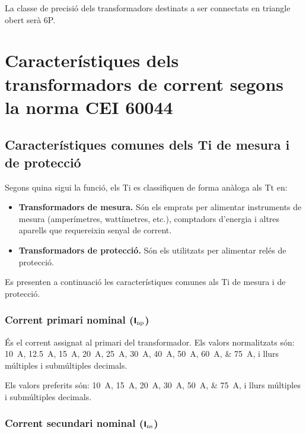 La classe de precisió dels transformadors destinats a ser connectats en triangle obert serà 6P.

\section{Característiques dels transformadors de corrent segons la norma  CEI 60044}

\subsection{Característiques comunes dels Ti de mesura i de protecció}

Segons quina sigui la  funció, els Ti es classifiquen de forma
anàloga als Tt en:
\begin{itemize}
	\item \textbf{Transformadors de mesura.} Són els emprats per alimentar
	instruments de mesura (amperímetres, wattímetres, etc.),
	comptadors d'energia i altres aparells que requereixin senyal de corrent.
	\item \textbf{Transformadors de protecció.} Són els utilitzats per
	alimentar relés de protecció.
\end{itemize}			

Es presenten a continuació les característiques comunes als Ti de
mesura i de protecció.


\subsubsection{Corrent primari nominal (${\boldsymbol{\mathsf{I_\text{np}}}}$)}

 És el corrent assignat al
primari del transformador. Els valors normalitzats
són: \qtylist{10; 12,5; 15; 20; 25;30; 40; 50; 60;75}{A}, i llurs múltiples i submúltiples decimals.

Els valors preferits són: \qtylist{10; 15; 20; 30; 50;75}{A}, i llurs múltiples i submúltiples decimals.


\subsubsection{Corrent secundari nominal (${\boldsymbol{\mathsf{I_\text{ns}}}}$)}

